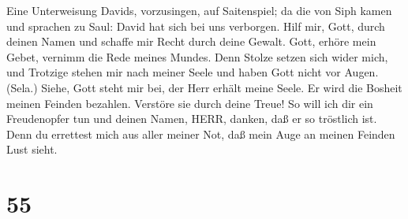  Eine Unterweisung Davids, vorzusingen, auf Saitenspiel; da
die von Siph kamen und sprachen zu Saul: David hat sich bei uns
verborgen. Hilf mir, Gott, durch deinen Namen und schaffe mir Recht
durch deine Gewalt.  Gott, erhöre mein Gebet, vernimm die
Rede meines Mundes.  Denn Stolze setzen sich wider mich, und
Trotzige stehen mir nach meiner Seele und haben Gott nicht vor Augen.
(Sela.)  Siehe, Gott steht mir bei, der Herr erhält meine
Seele.  Er wird die Bosheit meinen Feinden bezahlen.
Verstöre sie durch deine Treue!  So will ich dir ein
Freudenopfer tun und deinen Namen, HERR, danken, daß er so tröstlich
ist.  Denn du errettest mich aus aller meiner Not, daß mein
Auge an meinen Feinden Lust sieht.

\hypertarget{section-54}{%
\section{55}\label{section-54}}

